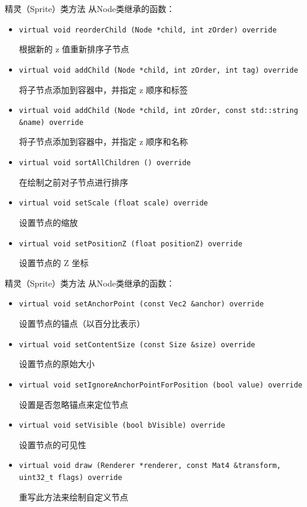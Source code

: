 \documentclass{beamer}
\begin{document}

\begin{frame}[fragile]{精灵（Sprite）类方法}
从Node类继承的函数：
\begin{itemize}
\item \texttt{virtual void reorderChild (Node *child, int zOrder) override}

根据新的 z 值重新排序子节点
\item \texttt{virtual void addChild (Node *child, int zOrder, int tag) override}

将子节点添加到容器中，并指定 z 顺序和标签
\item \texttt{virtual void addChild (Node *child, int zOrder, const std::string \&name) override}

将子节点添加到容器中，并指定 z 顺序和名称
\item \texttt{virtual void sortAllChildren () override}

在绘制之前对子节点进行排序
\item \texttt{virtual void setScale (float scale) override}

设置节点的缩放
\item \texttt{virtual void setPositionZ (float positionZ) override}

设置节点的 Z 坐标
\end{itemize}
\end{frame}


\begin{frame}[fragile]{精灵（Sprite）类方法}
从Node类继承的函数：
\begin{itemize}
\item \texttt{virtual void setAnchorPoint (const Vec2 \&anchor) override}

设置节点的锚点（以百分比表示）
\item \texttt{virtual void setContentSize (const Size \&size) override}

设置节点的原始大小
\item \texttt{virtual void setIgnoreAnchorPointForPosition (bool value) override}

设置是否忽略锚点来定位节点
\item \texttt{virtual void setVisible (bool bVisible) override}

设置节点的可见性
\item \texttt{virtual void draw (Renderer *renderer, const Mat4 \&transform, uint32\_t flags) override}

重写此方法来绘制自定义节点
\end{itemize}
\end{frame}
\end{document}
